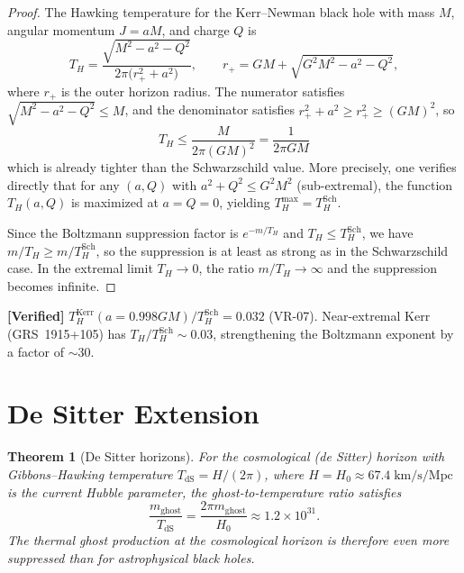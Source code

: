 \documentclass[11pt,a4paper]{article}
\newcommand{\mghost}{m_{\mathrm{ghost}}}
\newcommand{\Thr}{T_{\!\scriptscriptstyle H}}
\theoremstyle{plain}
\newtheorem{theorem}{Theorem}[section]
\theoremstyle{definition}
\newcommand{\verified}[1]{%
  \par\smallskip\noindent
  \colorbox{green!10}{\parbox{\dimexpr\linewidth-2\fboxsep}{%
    \textcolor{green!50!black}{\textbf{[Verified]}} #1}}%
  \par\smallskip}
\begin{document}
\begin{proof}
  The Hawking temperature for the Kerr--Newman black hole with mass
  $M$, angular momentum $J = aM$, and charge $Q$ is
  \begin{equation}\label{eq:TH_KN}
    \Thr
    = \frac{\sqrt{M^2 - a^2 - Q^2}}{2\pi\bigl(
      r_+^2 + a^2\bigr)},
    \qquad
    r_+ = GM + \sqrt{G^2M^2 - a^2 - Q^2},
  \end{equation}
  where $r_+$ is the outer horizon radius.  The numerator satisfies
  $\sqrt{M^2-a^2-Q^2}\leq M$, and the denominator satisfies
  $r_+^2 + a^2 \geq r_+^2 \geq (GM)^2$, so
  \[
    \Thr \leq \frac{M}{2\pi(GM)^2} = \frac{1}{2\pi G M}
  \]
  which is already tighter than the Schwarzschild value.
  More precisely, one verifies directly that for any
  $(a,Q)$ with $a^2+Q^2 \leq G^2M^2$ (sub-extremal), the function
  $\Thr(a,Q)$ is maximized at $a=Q=0$, yielding
  $\Thr^{\mathrm{max}} = \Thr^{\mathrm{Sch}}$.

  Since the Boltzmann suppression factor is
  $e^{-m/\Thr}$ and $\Thr \leq \Thr^{\mathrm{Sch}}$, we have
  $m/\Thr \geq m/\Thr^{\mathrm{Sch}}$, so the suppression is at
  least as strong as in the Schwarzschild case.  In the extremal limit
  $\Thr\to 0$, the ratio $m/\Thr \to \infty$ and the suppression
  becomes infinite.
\end{proof}

\verified{$\Thr^{\mathrm{Kerr}}(a=0.998GM) / \Thr^{\mathrm{Sch}}
= 0.032$ (VR-07).  Near-extremal Kerr (GRS~1915+105) has
$\Thr / \Thr^{\mathrm{Sch}} \sim 0.03$, strengthening the Boltzmann
exponent by a factor of $\sim 30$.}


\section{De Sitter Extension}\label{sec:de_sitter}

\begin{theorem}[De Sitter horizons]\label{thm:de_sitter}
  For the cosmological (de Sitter) horizon with Gibbons--Hawking
  temperature $T_{\mathrm{dS}} = H/(2\pi)$, where
  $H = H_0 \approx 67.4\;\mathrm{km/s/Mpc}$ is the current
  Hubble parameter, the ghost-to-temperature ratio satisfies
  \begin{equation}\label{eq:m_TdS}
    \frac{\mghost}{T_{\mathrm{dS}}}
    = \frac{2\pi \mghost}{H_0}
    \approx 1.2\times 10^{31}.
  \end{equation}
  The thermal ghost production at the cosmological horizon is therefore
  even more suppressed than for astrophysical black holes.
\end{theorem}
\end{document}
